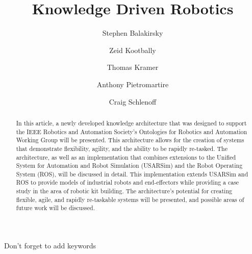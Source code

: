 \documentclass[preprint,12pt]{elsarticle}
\begin{document}
\begin{frontmatter}



\title{Knowledge Driven Robotics}


\author[NIST]{Stephen Balakirsky}
\author[NIST,UMD]{Zeid Kootbally}
\author[CATHU,NIST]{Thomas Kramer}
\author[NIST]{Anthony Pietromartire}
\author[NIST]{Craig Schlenoff}

\address[CATHU]{Catholic University of America, Washington, DC, USA}
\address[NIST]{National Institute of Standards and Technology, Gaithersburg, MD USA}
\address[UMD]{University of Maryland, College Park, MD, USA}

\begin{abstract}
In this article,  a newly developed knowledge architecture that was designed to support the IEEE Robotics and Automation Society's Ontologies for Robotics and Automation Working Group
will be presented. This architecture allows for the creation of systems that demonstrate flexibility, agility, and the ability to be rapidly re-tasked. The architecture, as well as
an implementation that combines extensions to the Unified System for Automation and Robot Simulation (USARSim) and the Robot Operating System (ROS), will be discussed
in detail. This implementation extends USARSim and ROS to provide models of industrial robots and end-effectors while providing a case study in the area of robotic kit building.
The architecture's potential for creating flexible, agile, and rapidly re-taskable systems will be presented, and possible areas of future work will be discussed.
\end{abstract}

\begin{keyword}
Don't forget to add keywords


\end{keyword}

\end{frontmatter}
\end{document}
